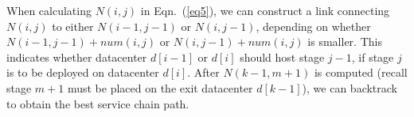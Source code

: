 When calculating $N(i,j)$ in Eqn.~(\ref{eq5}), we can construct a link connecting $N(i, j)$ to either $N(i-1, j-1)$ or $N(i, j-1)$, depending on whether $N(i-1, j-1)+num(i,j)$ or $N(i, j-1)+num(i,j)$ is smaller. This indicates whether datacenter $d[i-1]$ or $d[i]$ should host stage $j-1$, if stage $j$ is to be deployed on datacenter $d[i]$. After $N(k-1, m+1)$ is computed (recall stage $m+1$ must be placed on the exit datacenter $d[k-1]$),  we can backtrack to obtain the best service chain path.











